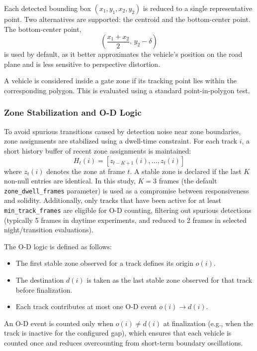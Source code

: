 Each detected bounding box $(x_1,y_1,x_2,y_2)$ is reduced to a single representative point. Two alternatives are supported: the centroid and the bottom-center point. The bottom-center point,
\begin{equation}
\left(\frac{x_1+x_2}{2},\,y_2-\delta\right)
\label{eq:anchor-point}
\end{equation}
is used by default, as it better approximates the vehicle's position on the road plane and is less sensitive to perspective distortion.

A vehicle is considered inside a gate zone if its tracking point lies within the corresponding polygon. This is evaluated using a standard point-in-polygon test.

\subsubsection{Zone Stabilization and O-D Logic}
\label{sec:method_od_logic}

To avoid spurious transitions caused by detection noise near zone boundaries, zone assignments are stabilized using a dwell-time constraint. For each track $i$, a short history buffer of recent zone assignments is maintained:
\begin{equation}
H_t(i) = [z_{t-K+1}(i), \ldots, z_t(i)]
\label{eq:history-buffer}
\end{equation}
where $z_t(i)$ denotes the zone at frame $t$. A stable zone is declared if the last $K$ non-null entries are identical. In this study, $K=3$ frames (the default \texttt{zone\_dwell\_frames} parameter) is used as a compromise between responsiveness and solidity. Additionally, only tracks that have been active for at least \texttt{min\_track\_frames} are eligible for O-D counting, filtering out spurious detections (typically 5 frames in daytime experiments, and reduced to 2 frames in selected night/transition evaluations).

The O-D logic is defined as follows:
\begin{itemize}
    \item The first stable zone observed for a track defines its origin $o(i)$.
    \item The destination $d(i)$ is taken as the last stable zone observed for that track before finalization.
    \item Each track contributes at most one O-D event $o(i) \rightarrow d(i)$.
\end{itemize}

An O-D event is counted only when $o(i) \neq d(i)$ at finalization (e.g., when the track is inactive for the configured gap), which ensures that each vehicle is counted once and reduces overcounting from short-term boundary oscillations.

